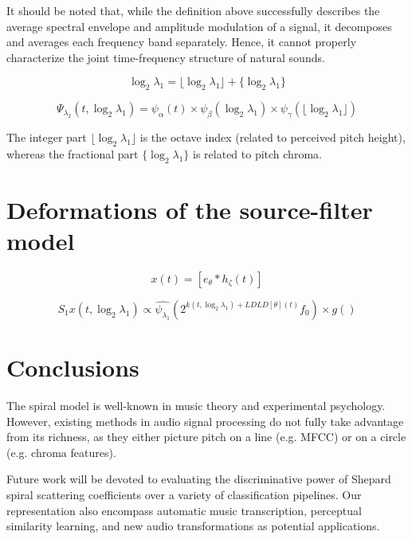 \documentclass[twoside,a4paper]{article}
\begin{document}
It should be noted that, while the definition above successfully describes the average spectral envelope and amplitude modulation of a signal, it decomposes and averages each frequency band separately. Hence, it cannot properly characterize the joint time-frequency structure of natural sounds.

\[
\log_2 \lambda_1 = \lfloor \log_2 \lambda_1 \rfloor + \{ \log_2 \lambda_1 \}
\]

\[
\Psi_{\lambda_2}(t, \log_2 \lambda_1) =
\psi_{\alpha}(t) \times
\psi_{\beta}(\log_2 \lambda_1) \times
\psi_{\gamma}(\lfloor \log_2 \lambda_1 \rfloor)
\]

The integer part $\lfloor \log_2 \lambda_1 \rfloor$ is the octave index (related to perceived pitch height), whereas the fractional part $\{ \log_2 \lambda_1 \}$ is related to pitch chroma.

\section{Deformations of the source-filter model}

\[
x(t) = \left[ e_{\theta}\ast h_{\zeta} (t) \right]
\]

\[
S_1 x(t,\log_2 \lambda_1) \propto
\widehat{\psi_{\lambda_1}}\left( 2^{k(t,\log_2 \lambda_1) + LDLD[\theta](t)} f_0 \right) \times
g\left(  \right)
\]

\section{Conclusions}

The spiral model is well-known in music theory and experimental psychology. However, existing methods in audio signal processing do not fully take advantage from its richness, as they either picture pitch on a line (e.g. MFCC) or on a circle (e.g. chroma features).

Future work will be devoted to evaluating the discriminative power of Shepard spiral scattering coefficients over a variety of classification pipelines. Our representation also encompass automatic music transcription, perceptual similarity learning, and new audio transformations as potential applications.

\nocite{*}

 
\end{document}
